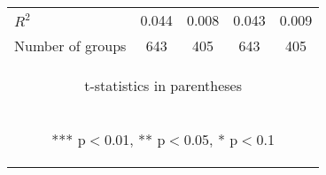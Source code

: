 \documentclass[]{article}
\begin{document}
\begin{center}
\begin{tabular}{lcccc}
        $R^2$            & 0.044                                           & 0.008                                          & 0.043                                          & 0.009                                          \\
        Number of groups & 643                                             & 405                                            & 643                                            & 405                                            \\ \hline
        \multicolumn{5}{c}{\begin{footnotesize} t-statistics in parentheses\end{footnotesize}}                                                                                                                                \\
        \multicolumn{5}{c}{\begin{footnotesize} *** p$<$0.01, ** p$<$0.05, * p$<$0.1\end{footnotesize}}                                                                                                                       \\
    \end{tabular}
\end{center}
\end{document}
